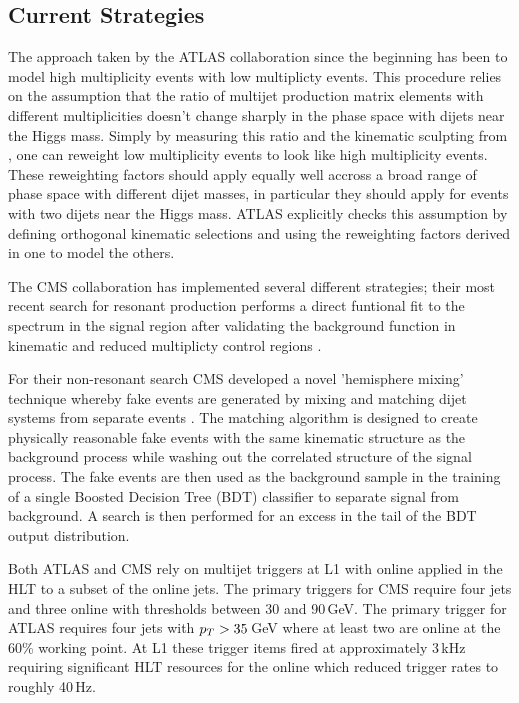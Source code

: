 \subsection{Current Strategies}
\label{sec:current4b}

The approach taken by the ATLAS collaboration since the beginning has been to model high \bjet multiplicity events with low \bjet multiplicty events.
This procedure relies on the assumption that the ratio of multijet production matrix elements with different \bjet multiplicities doesn't change sharply in the phase space with dijets near the Higgs mass.
Simply by measuring this ratio and the kinematic sculpting from \btagging, one can reweight low \bjet multiplicity events to look like high \bjet multiplicity events.
These reweighting factors should apply equally well accross a broad range of phase space with different dijet masses, in particular they should apply for events with two dijets near the Higgs mass. 
ATLAS explicitly checks this assumption by defining orthogonal kinematic selections and using the reweighting factors derived in one to model the others. 

The CMS collaboration has implemented several different strategies;
their most recent search for resonant \hh production performs a direct funtional fit to the \mhh spectrum in the signal region
after validating the background function in kinematic and reduced \btag multiplicty control regions \cite{Sirunyan:2018zkk}.

For their non-resonant search CMS developed a novel 'hemisphere mixing' technique whereby fake events are generated by mixing and matching dijet systems from separate events \cite{CMS-PAS-HIG-17-017}.
The matching algorithm is designed to create physically reasonable fake events with the same kinematic structure as the background process while washing out the correlated structure of the signal process.
The fake events are then used as the background sample in the training of a single Boosted Decision Tree (BDT) classifier to separate signal from background.
A search is then performed for an excess in the tail of the BDT output distribution.

Both ATLAS and CMS rely on multijet triggers at L1 with online \btagging applied in the HLT to a subset of the online jets.
The primary triggers for CMS require four jets and three online \btags with \pt thresholds between 30 and 90\,GeV.
The primary trigger for ATLAS requires four jets with $p_T>35\,$GeV where at least two are \btagged online at the 60\% working point.
At L1 these trigger items fired at approximately 3\,kHz requiring significant HLT resources for the online \btagging which reduced trigger rates to roughly 40\,Hz. 

